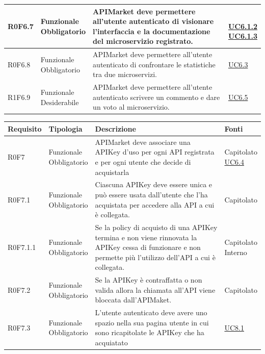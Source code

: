 \documentclass[12pt,a4paper,titlepage]{article}
\newcommand{\minitab}[2][1]{\begin{tabular}#1 #2\end{tabular}}
\newcommand{\uc}[1]{\hyperref[UC#1]{UC#1}}
\begin{document}
{\begin{longtable}{|m{5em}|m{6em}|m{28em}|m{5em}|}
			\hline
			R0F6.7 & \minitab[c]{Funzionale\\Obbligatorio} & APIMarket deve permettere all'utente autenticato di visionare l'interfaccia e la documentazione del microservizio registrato. & \shortstack[l]{\\\uc{6.1.2}\\\uc{6.1.3}}\\
			\hline
			R0F6.8 & \minitab[c]{Funzionale\\Obbligatorio} & APIMarket deve permettere all'utente autenticato di confrontare le statistiche tra due microservizi. & \uc{6.3}\\
			\hline
			R1F6.9 & \minitab[c]{Funzionale\\Desiderabile} & APIMarket deve permettere all'utente autenticato scrivere un commento e dare un voto al microservizio. & \uc{6.5}\\
			\hline
		\end{longtable}
		\begin{longtable}{|m{5em}|m{6em}|m{28em}|m{5em}|}
			\hline
			\textbf{Requisito} & \textbf{Tipologia}  & \textbf{Descrizione} & \textbf{Fonti} \\
			\hline
			R0F7 & \minitab[c]{Funzionale\\Obbligatorio} & APIMarket deve associare una APIKey d'uso per ogni API registrata e per ogni utente che decide di acquistarla & \shortstack[l]{Capitolato\\\uc{6.4}}\\
			\hline
			R0F7.1 & \minitab[c]{Funzionale\\Obbligatorio} & Ciascuna APIKey deve essere unica e può essere usata dall'utente che l'ha acquistata per accedere alla API a cui è collegata. & Capitolato\\
			\hline
			R0F7.1.1 & \minitab[c]{Funzionale\\Obbligatorio} & Se la policy di acquisto di una APIKey termina e non viene rinnovata la APIKey cessa di funzionare e non permette più l'utilizzo dell'API a cui è collegata. & \shortstack[l]{Capitolato \\ Interno}\\
			\hline
			R0F7.2 & \minitab[c]{Funzionale\\Obbligatorio} & Se la APIKey è contraffatta o non valida allora la chiamata all'API viene bloccata dall'APIMaket. & Capitolato\\
			\hline
			R0F7.3 & \minitab[c]{Funzionale\\Obbligatorio} & L'utente autenticato deve avere uno spazio nella sua pagina utente in cui sono ricapitolate le APIKey che ha acquiatato & \uc{8.1}\\

\end{longtable}}
\end{document}
